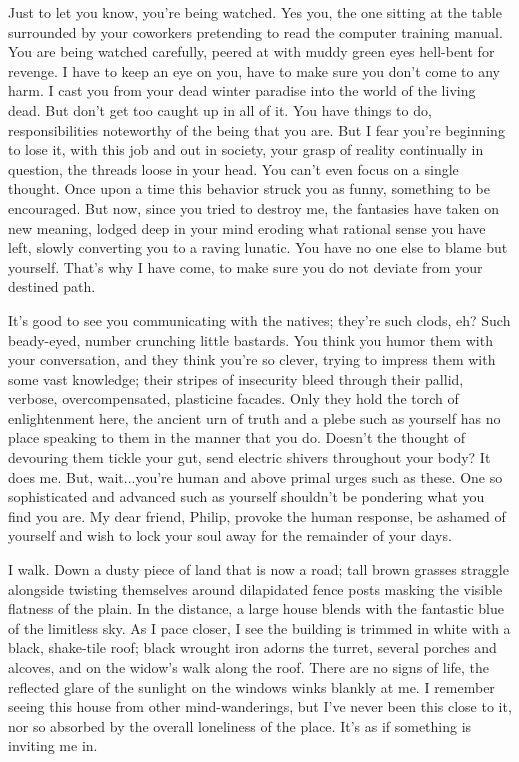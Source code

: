 Just to let you know, you're being watched. Yes you, the one sitting at
the table surrounded by your coworkers pretending to read the computer
training manual. You are being watched carefully, peered at with muddy
green eyes hell-bent for revenge. I have to keep an eye on you, have to
make sure you don't come to any harm. I cast you from your dead winter
paradise into the world of the living dead. But don't get too caught up
in all of it. You have things to do, responsibilities noteworthy of the
being that you are. But I fear you're beginning to lose it, with this
job and out in society, your grasp of reality continually in question,
the threads loose in your head. You can't even focus on a single
thought. Once upon a time this behavior struck you as funny, something
to be encouraged. But now, since you tried to destroy me, the fantasies
have taken on new meaning, lodged deep in your mind eroding what
rational sense you have left, slowly converting you to a raving lunatic.
You have no one else to blame but yourself. That's why I have come, to
make sure you do not deviate from your destined path.

It's good to see you communicating with the natives; they're such clods,
eh? Such beady-eyed, number crunching little bastards. You think you
humor them with your conversation, and they think you're so clever,
trying to impress them with some vast knowledge; their stripes of
insecurity bleed through their pallid, verbose, overcompensated,
plasticine facades. Only they hold the torch of enlightenment here, the
ancient urn of truth and a plebe such as yourself has no place speaking
to them in the manner that you do. Doesn't the thought of devouring them
tickle your gut, send electric shivers throughout your body? It does me.
But, wait...you're human and above primal urges such as these. One so
sophisticated and advanced such as yourself shouldn't be pondering what
you find you are. My dear friend, Philip, provoke the human response, be
ashamed of yourself and wish to lock your soul away for the remainder of
your days.

I walk. Down a dusty piece of land that is now a road; tall brown
grasses straggle alongside twisting themselves around dilapidated fence
posts masking the visible flatness of the plain. In the distance, a
large house blends with the fantastic blue of the limitless sky. As I
pace closer, I see the building is trimmed in white with a black,
shake-tile roof; black wrought iron adorns the turret, several porches
and alcoves, and on the widow's walk along the roof. There are no signs
of life, the reflected glare of the sunlight on the windows winks
blankly at me. I remember seeing this house from other mind-wanderings,
but I've never been this close to it, nor so absorbed by the overall
loneliness of the place. It's as if something is inviting me in.

